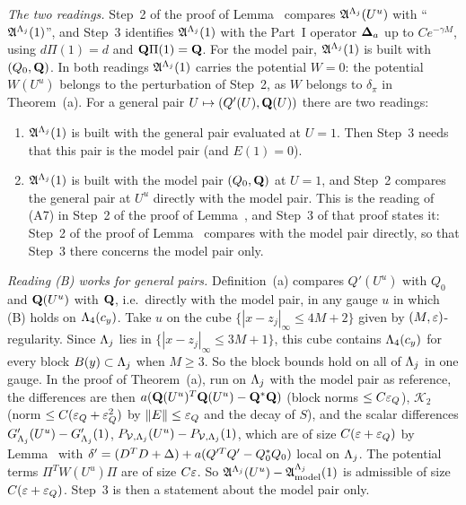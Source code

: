 \begin{detail}\label{d7:A7}
\emph{The two readings.} Step~2 of the proof of Lemma~ compares $\mathfrak A^{\Lambda_j}(U^u)$ with ``$\mathfrak A^{\Lambda_j}(1)$'', and Step~3 identifies $\mathfrak A^{\Lambda_j}(1)$ with the Part~I operator $\boldsymbol{\Delta}_a$ up to $Ce^{-\gamma M}$, using $d\Pi(1)=d$ and $\mathbf Q\Pi(1)=\mathbf Q$. For the model pair, $\mathfrak A^{\Lambda_j}(1)$ is built with $(Q_0,\mathbf Q)$. In both readings $\mathfrak A^{\Lambda_j}(1)$ carries the potential $W=0$: the potential $W(U^u)$ belongs to the perturbation of Step~2, as $W$ belongs to $\delta_\pi$ in Theorem~(a). For a general pair $U\mapsto(Q'(U),\mathbf Q(U))$ there are two readings:
\begin{enumerate}[label=(\Alph*)]
\item $\mathfrak A^{\Lambda_j}(1)$ is built with the general pair evaluated at $U=1$. Then Step~3 needs that this pair is the model pair (and $E(1)=0$).
\item $\mathfrak A^{\Lambda_j}(1)$ is built with the model pair $(Q_0,\mathbf Q)$ at $U=1$, and Step~2 compares the general pair at $U^u$ directly with the model pair. This is the reading of (A7) in Step~2 of the proof of Lemma~, and Step~3 of that proof states it: Step~2 of the proof of Lemma~ compares with the model pair directly, so that Step~3 there concerns the model pair only.
\end{enumerate}
\begin{step}
\emph{Reading (B) works for general pairs.} Definition~(a) compares $Q'(U^u)$ with $Q_0$ and $\mathbf Q(U^u)$ with $\mathbf Q$, i.e.\ directly with the model pair, in any gauge $u$ in which (B) holds on $\Lambda_4(c_y)$. Take $u$ on the cube $\{|x-z_j|_\infty\le4M+2\}$ given by $(M,\varepsilon)$-regularity. Since $\Lambda_j$ lies in $\{|x-z_j|_\infty\le3M+1\}$, this cube contains $\Lambda_4(c_y)$ for every block $B(y)\subset\Lambda_j$ when $M\ge3$. So the block bounds hold on all of $\Lambda_j$ in one gauge. In the proof of Theorem~(a), run on $\Lambda_j$ with the model pair as reference, the differences are then $a(\mathbf Q(U^u)^T\mathbf Q(U^u)-\mathbf Q^*\mathbf Q)$ (block norms $\le C\varepsilon_Q$), $\mathcal K_2$ (norm $\le C(\varepsilon_Q+\varepsilon_Q^2)$ by $\|E\|\le\varepsilon_Q$ and the decay of $S$), and the scalar differences $G'_{\Lambda_j}(U^u)-G'_{\Lambda_j}(1)$, $P_{\mathcal V,\Lambda_j}(U^u)-P_{\mathcal V,\Lambda_j}(1)$, which are of size $C(\varepsilon+\varepsilon_Q)$ by Lemma~ with $\delta'=(D^TD+\Delta)+a(Q'^TQ'-Q_0^*Q_0)$ local on $\Lambda_j$. The potential terms $\Pi^TW(U^u)\Pi$ are of size $C\varepsilon$. So $\mathfrak A^{\Lambda_j}(U^u)-\mathfrak A^{\Lambda_j}_{\rm model}(1)$ is admissible of size $C(\varepsilon+\varepsilon_Q)$. Step~3 is then a statement about the model pair only.

\end{step}
\end{detail}
